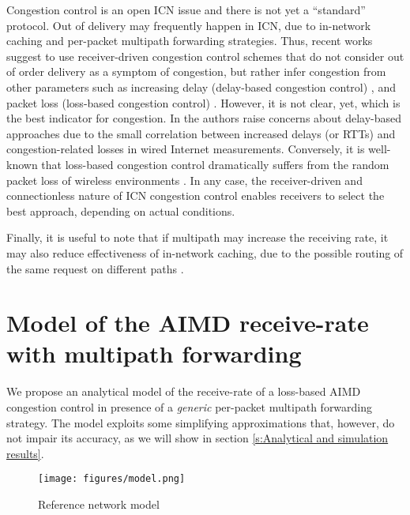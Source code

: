 \documentclass{sig-alternate-10pt}
\begin{document}
Congestion control is an open ICN issue and there is not yet a ``standard'' protocol. Out of delivery may frequently happen in ICN, due to in-network caching and per-packet multipath forwarding strategies. Thus, recent works suggest to use receiver-driven congestion control schemes that do not consider out of order delivery as a  symptom of congestion, but rather infer congestion from other parameters such as increasing delay (delay-based congestion control) \cite{carofigliooptimal}\cite{carofigliomultipath}, and packet loss (loss-based congestion control) \cite{braun2013empirical} \cite{saino2013cctcp}. However, it is not clear, yet, which is the best indicator for congestion. In \cite{prasad2004effectiveness} the authors raise concerns about delay-based approaches due to the small correlation between increased delays (or RTTs) and congestion-related losses in wired Internet measurements. Conversely, it is well-known that loss-based congestion control dramatically suffers from the random packet loss of wireless environments \cite{balakrishnan1997comparison}. In any case, the receiver-driven and connectionless nature of ICN congestion control enables receivers to select the best approach, depending on actual conditions.

Finally, it is useful to note that if multipath may increase the receiving rate, it may also reduce effectiveness of in-network caching, due to the possible routing of the same request on different paths \cite{udugama2013analytical}\cite{rossi2011caching}.





\section{Model of the AIMD receive-rate with multipath forwarding}
We propose an analytical model of the receive-rate of a loss-based AIMD congestion control in presence of a \emph{generic} per-packet multipath forwarding strategy. The model exploits some simplifying approximations that, however, do not impair its accuracy, as we will show in section \ref{s:Analytical and simulation results}.
\begin{figure}[t]
\centering
\texttt{[image: figures/model.png]}
\caption{Reference network model}
\label{f:model1}
\vspace{-10pt}
\end{figure}
\end{document}
